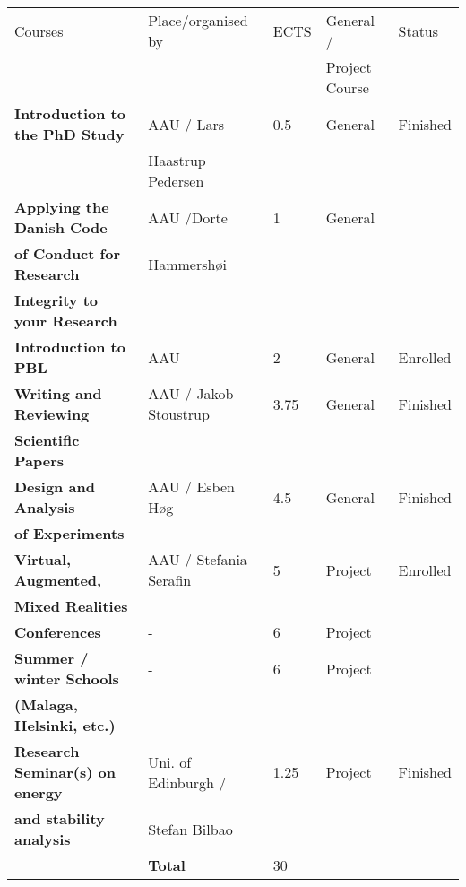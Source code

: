 \begin{tabular}{|l|l|l|l|l|}
\hline
   Courses  & Place/organised by & ECTS & General / & Status \\
   & & & Project Course & \\
   \hline
   
\rowcolor{lightestblue} \bf Introduction to the PhD Study & AAU / Lars & 0.5 & General &  Finished \\ 
\rowcolor{lightestblue} & Haastrup Pedersen & & & \\ 
\bf Applying the Danish Code & AAU /Dorte & 1 & General & \\ \bf of Conduct for Research & Hammersh\o i  & & & \\ \bf 
 Integrity to your Research & & & & \\ 
\rowcolor{lightestblue}\bf Introduction to PBL & AAU & 2 & General & Enrolled \\ \bf 
   Writing and Reviewing & AAU / Jakob Stoustrup & 3.75 & General & Finished \\ \bf 
   Scientific Papers & & & & \\
\rowcolor{lightestblue} \bf Design and Analysis& AAU / Esben H\o g & 4.5 & General & Finished\\
\rowcolor{lightestblue} \bf  of Experiments & & & & \\ 
\bf Virtual, Augmented, & AAU / Stefania Serafin & 5 & Project & Enrolled\\ \bf 
    Mixed Realities & & & &\\
    \rowcolor{lightestblue} \bf Conferences & - & 6 & Project & \\ \bf 
  Summer / winter Schools & - & 6 & Project & \\ \bf 
 (Malaga, Helsinki, etc.) & & & &\\ 
 \rowcolor{lightestblue} \bf Research Seminar(s) on energy & Uni. of Edinburgh / &  1.25 & Project & Finished \\ 
\rowcolor{lightestblue} \bf and stability analysis & Stefan Bilbao & & &\\
& \bf Total & 30 & & \\
    \hline
\end{tabular}

